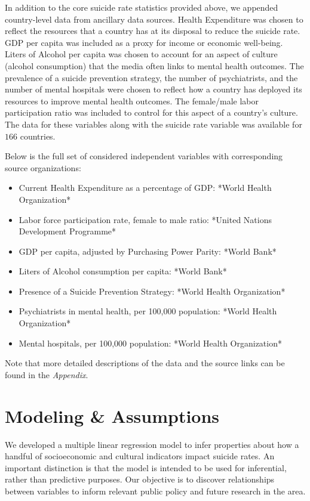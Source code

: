 \documentclass[]{article}
\begin{document}
In addition to the core suicide rate statistics provided above, we
appended country-level data from ancillary data sources. Health
Expenditure was chosen to reflect the resources that a country has at
its disposal to reduce the suicide rate. GDP per capita was included as
a proxy for income or economic well-being. Liters of Alcohol per capita
was chosen to account for an aspect of culture (alcohol consumption)
that the media often links to mental health outcomes. The prevalence of
a suicide prevention strategy, the number of psychiatrists, and the
number of mental hospitals were chosen to reflect how a country has
deployed its resources to improve mental health outcomes. The
female/male labor participation ratio was included to control for this
aspect of a country's culture. The data for these variables along with
the suicide rate variable was available for \(166\) countries.

Below is the full set of considered independent variables with
corresponding source organizations:

\begin{itemize}
  \item Current Health Expenditure as a percentage of GDP: *World Health Organization*  
  \item Labor force participation rate, female to male ratio: *United Nations Development Programme*
  \item GDP per capita, adjusted by Purchasing Power Parity: *World Bank*
  \item Liters of Alcohol consumption per capita: *World Bank*
  \item Presence of a Suicide Prevention Strategy: *World Health Organization*
  \item Psychiatrists in mental health, per 100,000 population: *World Health Organization*
  \item Mental hospitals, per 100,000 population: *World Health Organization*
\end{itemize}

Note that more detailed descriptions of the data and the source links
can be found in the \emph{Appendix}.

\section{Modeling \& Assumptions}\label{modeling-assumptions}

We developed a multiple linear regression model to infer properties
about how a handful of socioeconomic and cultural indicators impact
suicide rates. An important distinction is that the model is intended to
be used for inferential, rather than predictive purposes. Our objective
is to discover relationships between variables to inform relevant public
policy and future research in the area.
\end{document}
